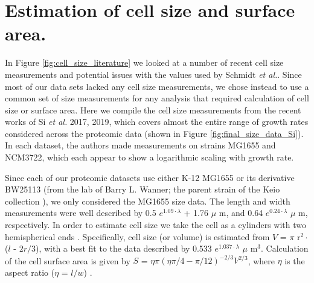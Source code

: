 \section{Estimation of cell size and surface area.}

In Figure \ref{fig:cell_size_literature} we looked at a number of recent cell
size measurements and potential issues with the values used by Schmidt
\textit{et al.}. Since most of our data sets lacked any cell size measurements,
we chose instead to use a common set of size measurements for any analysis
that required calculation of cell size or surface area. Here we compile the
cell size measurements from the recent works of Si \textit{et al.} 2017, 2019,
which covers almost the entire range of growth rates considered across the
proteomic data (shown in Figure \ref{fig:final_size_data_Si}). In each dataset,
the authors made measurements on strains MG1655 and NCM3722, which each appear
to show a logarithmic scaling with growth rate.

Since each of our proteomic datasets use either K-12 MG1655 or its derivative
BW25113 (from the lab of Barry L. Wanner; the parent strain of the Keio
collection \citep{datsenko2000, baba2006}), we only considered the MG1655 size data. The
length and width measurements  were well described by 0.5 $e^{1.09 \cdot
\lambda}$ + 1.76 $\mu$ m, and 0.64 $e^{0.24 \cdot \lambda}$ $\mu$ m,
respectively. In order to estimate cell size we take the cell as a cylinders
with two hemispherical ends \citep{si2017, basan2015}. Specifically,  cell size
(or volume) is estimated from $V$ = $\pi$ r$^2 \cdot$ ($l$ - $2r/3$), with a
best fit to the data described by 0.533 $e^{1.037 \cdot \lambda}$ $\mu$ m$^3$.
Calculation of the cell surface area is given by $S$ = $\eta \pi (\eta \pi / 4 -
\pi/12)^{-2/3} V^{2/3}$, where $\eta$ is the aspect ratio ($\eta$ = $l/w$)
\citep{ojkic2019}.

